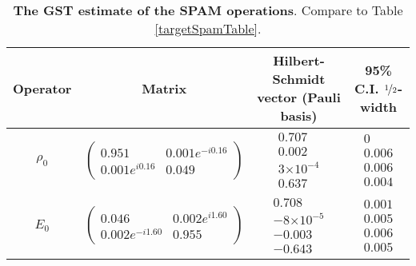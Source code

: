 \documentclass{article}[11pt]
\providecommand{\e}[1]{\ensuremath{\times 10^{#1}}}
\begin{document}
\begin{table}[h]
\begin{center}
\begin{tabular}[l]{|c|c|c|c|}
\hline
Operator & Matrix & Hilbert-Schmidt vector (Pauli basis) & 95\% C.I. $\nicefrac{1}{2}$-width \\ \hline
$\rho_{0}$ & $ \left(\!\!\begin{array}{cc}
0.951 & 0.001e^{-i0.16} \\ 
0.001e^{i0.16} & 0.049
 \end{array}\!\!\right) $
 & $ \begin{array}{c}
0.707 \\ 
0.002 \\ 
3\e{-4} \\ 
0.637
 \end{array} $
 & $ \begin{array}{c}
0 \\ 
0.006 \\ 
0.006 \\ 
0.004
 \end{array} $
 \\ \hline
$E_{0}$ & $ \left(\!\!\begin{array}{cc}
0.046 & 0.002e^{i1.60} \\ 
0.002e^{-i1.60} & 0.955
 \end{array}\!\!\right) $
 & $ \begin{array}{c}
0.708 \\ 
-8\e{-5} \\ 
-0.003 \\ 
-0.643
 \end{array} $
 & $ \begin{array}{c}
0.001 \\ 
0.005 \\ 
0.006 \\ 
0.005
 \end{array} $
 \\ \hline
\end{tabular}

\caption{\textbf{The GST estimate of the SPAM operations}.  Compare to Table \ref{targetSpamTable}.\label{bestGatesetSpamTable}}
\end{center}
\end{table}
\end{document}

